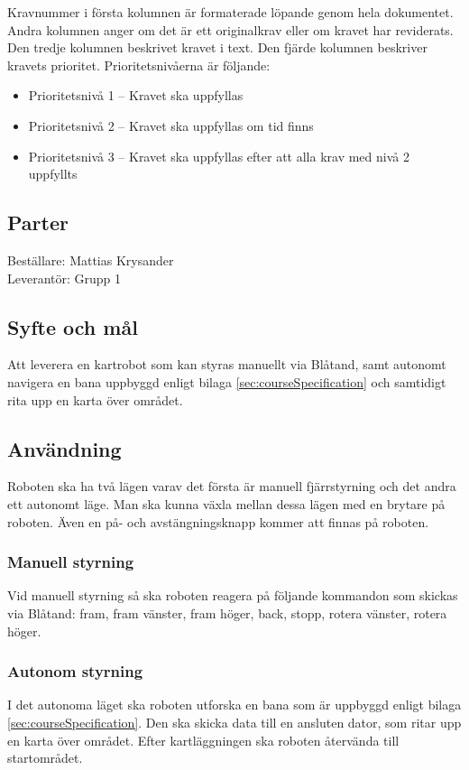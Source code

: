 \documentclass[a4paper,11pt]{article}
\newcommand{\LIPSprojektgrupp}{Grupp 1}
\begin{document}
Kravnummer i första kolumnen är formaterade löpande genom hela dokumentet. Andra kolumnen anger om det är ett originalkrav eller om kravet har reviderats. Den tredje kolumnen beskrivet kravet i text. Den fjärde kolumnen beskriver kravets prioritet. Prioritetsnivåerna är följande:
\begin{itemize}
    \item Prioritetsnivå 1 – Kravet ska uppfyllas
    \item Prioritetsnivå 2 – Kravet ska uppfyllas om tid finns
    \item Prioritetsnivå 3 – Kravet ska uppfyllas efter att alla krav med nivå 2 uppfyllts 
\end{itemize}
\subsection{Parter}
Beställare: Mattias Krysander \\
Leverantör: \LIPSprojektgrupp \\

\subsection{Syfte och mål}
Att leverera en kartrobot som kan styras manuellt via Blåtand, samt autonomt navigera en bana uppbyggd enligt bilaga \ref{sec:courseSpecification} och samtidigt rita upp en karta över området.  
\subsection{Användning}
Roboten ska ha två lägen varav det första är manuell fjärrstyrning och det andra ett autonomt läge. Man ska kunna växla mellan dessa lägen med en brytare på roboten. Även en på- och avstängningsknapp kommer att finnas på roboten.
\subsubsection{Manuell styrning}
Vid manuell styrning så ska roboten reagera på följande kommandon som skickas via Blåtand: fram, fram vänster, fram höger, back, stopp, rotera vänster, rotera höger. 
\subsubsection{Autonom styrning}
I det autonoma läget ska roboten utforska en bana som är uppbyggd enligt bilaga \ref{sec:courseSpecification}. Den ska skicka data till en ansluten dator, som ritar upp en karta över området. Efter kartläggningen ska roboten återvända till startområdet. 
\end{document}
